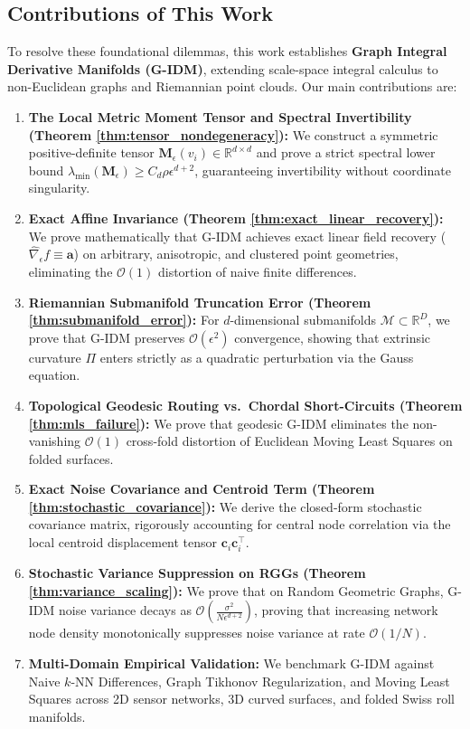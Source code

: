 \documentclass[11pt,a4paper]{article}
\theoremstyle{definition}
\begin{document}
\subsection{Contributions of This Work}
To resolve these foundational dilemmas, this work establishes \textbf{Graph Integral Derivative Manifolds (G-IDM)}, extending scale-space integral calculus to non-Euclidean graphs and Riemannian point clouds. Our main contributions are:
\begin{enumerate}
    \item \textbf{The Local Metric Moment Tensor and Spectral Invertibility (Theorem \ref{thm:tensor_nondegeneracy}):} We construct a symmetric positive-definite tensor $\mathbf{M}_\epsilon(v_i) \in \mathbb{R}^{d \times d}$ and prove a strict spectral lower bound $\lambda_{\min}(\mathbf{M}_\epsilon) \ge C_d \rho \epsilon^{d+2}$, guaranteeing invertibility without coordinate singularity.
    \item \textbf{Exact Affine Invariance (Theorem \ref{thm:exact_linear_recovery}):} We prove mathematically that G-IDM achieves exact linear field recovery ($\widehat{\nabla}_\epsilon f \equiv \mathbf{a}$) on arbitrary, anisotropic, and clustered point geometries, eliminating the $\mathcal{O}(1)$ distortion of naive finite differences.
    \item \textbf{Riemannian Submanifold Truncation Error (Theorem \ref{thm:submanifold_error}):} For $d$-dimensional submanifolds $\mathcal{M} \subset \mathbb{R}^D$, we prove that G-IDM preserves $\mathcal{O}(\epsilon^2)$ convergence, showing that extrinsic curvature $\Pi$ enters strictly as a quadratic perturbation via the Gauss equation.
    \item \textbf{Topological Geodesic Routing vs.\ Chordal Short-Circuits (Theorem \ref{thm:mls_failure}):} We prove that geodesic G-IDM eliminates the non-vanishing $\mathcal{O}(1)$ cross-fold distortion of Euclidean Moving Least Squares on folded surfaces.
    \item \textbf{Exact Noise Covariance and Centroid Term (Theorem \ref{thm:stochastic_covariance}):} We derive the closed-form stochastic covariance matrix, rigorously accounting for central node correlation via the local centroid displacement tensor $\mathbf{c}_i \mathbf{c}_i^\top$.
    \item \textbf{Stochastic Variance Suppression on RGGs (Theorem \ref{thm:variance_scaling}):} We prove that on Random Geometric Graphs, G-IDM noise variance decays as $\mathcal{O}\left(\frac{\sigma^2}{N \epsilon^{d+2}}\right)$, proving that increasing network node density monotonically suppresses noise variance at rate $\mathcal{O}(1/N)$.
    \item \textbf{Multi-Domain Empirical Validation:} We benchmark G-IDM against Naive $k$-NN Differences, Graph Tikhonov Regularization, and Moving Least Squares across 2D sensor networks, 3D curved surfaces, and folded Swiss roll manifolds.
\end{enumerate}
\end{document}
